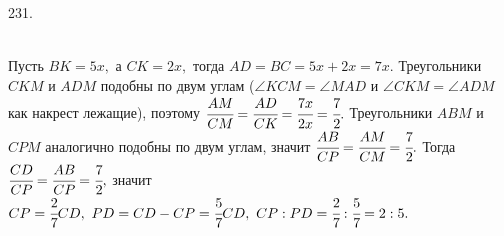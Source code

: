231. \begin{figure}[ht!]
\end{figure}\\
Пусть $BK=5x,$ а $CK=2x,$ тогда $AD=BC=5x+2x=7x.$ Треугольники $CKM$ и $ADM$ подобны по двум углам ($\angle KCM=\angle MAD$ и $\angle CKM=\angle ADM$ как накрест лежащие), поэтому $\cfrac{AM}{CM}=\cfrac{AD}{CK}=\cfrac{7x}{2x}=\cfrac{7}{2}.$ Треугольники $ABM$ и $CPM$ аналогично подобны по двум углам, значит $\cfrac{AB}{CP}=\cfrac{AM}{CM}=\cfrac{7}{2}.$ Тогда $\cfrac{CD}{CP}=\cfrac{AB}{CP}=\cfrac{7}{2},$ значит $CP=\cfrac{2}{7}CD,\ PD=CD-CP=\cfrac{5}{7}CD,\ CP:PD=\cfrac{2}{7}:\cfrac{5}{7}=2:5.$\\
